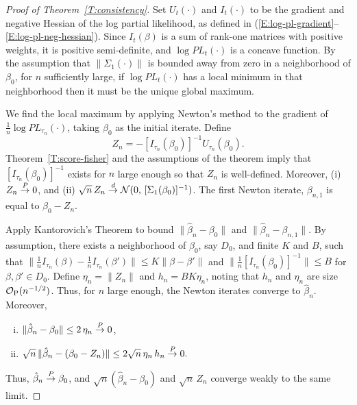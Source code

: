 \documentclass[aoas,preprint]{imsart}
\begin{document}
\begin{proof}[Proof of Theorem~\ref{T:consistency}]
Set $U_t(\cdot)$ and $I_t(\cdot)$ to be the gradient and negative
Hessian of the log partial likelihood, as defined in
(\ref{E:log-pl-gradient}--\ref{E:log-pl-neg-hessian}).  Since
$I_t(\beta)$ is a sum of rank-one matrices with positive weights,
it is positive semi-definite, and $\log \mathit{PL}_t(\cdot)$ is
a concave function.  By the assumption that $\| \Sigma_1(\cdot) \|$
is bounded away from zero in a neighborhood of $\beta_0$, for $n$
sufficiently large, if $\log \mathit{PL}_t(\cdot)$ has a local minimum
in that neighborhood then it must be the unique global maximum.

We find the local maximum by applying Newton's method to the
gradient of $\tfrac{1}{n} \log \mathit{PL}_{\tau_n}(\cdot)$, taking
$\beta_0$ as the initial iterate.  Define
\[
    Z_n = -[I_{\tau_n}(\beta_0)]^{-1} U_{\tau_n}(\beta_0).
\]
Theorem~\ref{T:score-fisher} and the
assumptions of the theorem imply that $[I_{\tau_n}(\beta_0)]^{-1}$
exists for $n$ large enough so that $Z_n$ is well-defined.  Moreover,
(i) $Z_n \overset{\mathit{P}}{\to} 0$, and
(ii) $\sqrt{n} \, Z_n \overset{\mathit{d}}{\to} \mathcal{N}(0, \, [\Sigma_1(\beta_0)]^{-1})$.
The first Newton iterate, $\beta_{n,1}$ is equal to $\beta_0 - Z_n$.

Apply Kantorovich's Theorem to bound $\| \hat \beta_n - \beta_0 \|$
and $\| \hat \beta_n - \beta_{n,1} \|$.  By assumption, there exists
a neighborhood of $\beta_0$, say $D_0$, and finite $K$ and $B$, such that 
\(
    \|
        \frac{1}{n} I_{\tau_n} (\beta)
        -
        \frac{1}{n} I_{\tau_n}(\beta')
    \|
    \leq
    K
    \|
        \beta
        -
        \beta'
    \|
\)
and
\(
    \| \frac{1}{n} [I_{\tau_n}(\beta_0)]^{-1} \| \leq B
\)
for $\beta, \beta' \in D_0$.
Define $\eta_n = \| Z_n \|$ and $h_n = B K \eta_n$, noting that $h_n$ and
$\eta_n$ are size $\mathcal{O}_\text{P}(n^{-1/2})$.  Thus, for $n$ large enough, the
Newton iterates converge to $\hat \beta_n$.  Moreover,
\begin{enumerate}[(i)]
    \item $\| \hat \beta_n - \beta_0 \| \leq 2 \, \eta_n \overset{\mathit{P}}{\to} 0$,
    \item 
        \(
            \sqrt{n} \, \| \hat \beta_n - (\beta_0 - Z_n) \|
            \leq
            2 \sqrt{n} \, \eta_n \, h_n
            \overset{\mathit{P}}{\to} 0.
        \)
\end{enumerate}
Thus, $\hat \beta_n \overset{\mathit{P}}{\to} \beta_0$, and $\sqrt{n} (\hat \beta_n - \beta_0)$
and $\sqrt{n} \, Z_n$ converge weakly to the same limit.

\end{proof}
\end{document}
